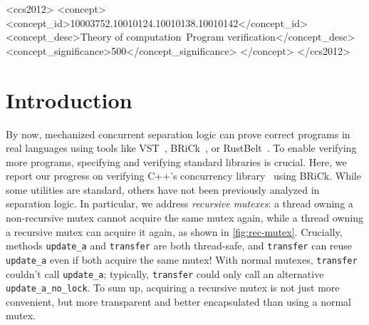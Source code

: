 \documentclass[sigplan,screen]{acmart}
\begin{document}
\begin{CCSXML}
<ccs2012>
<concept>
<concept_id>10003752.10010124.10010138.10010142</concept_id>
<concept_desc>Theory of computation~Program verification</concept_desc>
<concept_significance>500</concept_significance>
</concept>
</ccs2012>
\end{CCSXML}



\maketitle

\section{Introduction}
By now, mechanized concurrent separation logic can prove correct programs in real languages using tools like VST~\cite{vst}, BRiCk~\cite{brick}, or RustBelt~\cite{rustbelt}.
To enable verifying more programs, specifying and verifying standard libraries is crucial.
Here, we report our progress on verifying C++'s concurrency library~\cite{ISO:2024:IIP} using BRiCk. While some utilities are standard, others have not been previously
analyzed in separation logic.
In particular, we address \emph{recursive mutexes}:
a thread owning a non-recursive mutex cannot acquire the same mutex again,
while a thread owning a recursive mutex can acquire it again, as shown in \cref{fig:rec-mutex}.
Crucially, methods \verb!update_a! and \verb!transfer! are both thread-safe, and
\verb!transfer! can reuse \verb!update_a! even if both acquire the same mutex!
With normal mutexes, \verb!transfer! couldn't call \verb!update_a!; typically,
\verb!transfer! could only call an alternative \verb!update_a_no_lock!.
To sum up, acquiring a recursive mutex is not just more convenient, but more
transparent and better encapsulated than using a normal mutex.
\end{document}
